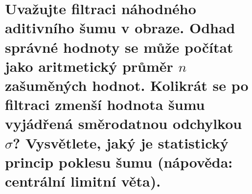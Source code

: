\section{Uvažujte filtraci náhodného aditivního šumu v obraze. Odhad správné hodnoty se může počítat jako aritmetický 
průměr $n$ zašuměných hodnot. Kolikrát se po filtraci zmenší hodnota šumu vyjádřená směrodatnou odchylkou $\sigma$? 
Vysvětlete, jaký je statistický princip poklesu šumu (nápověda: centrální limitní věta).}